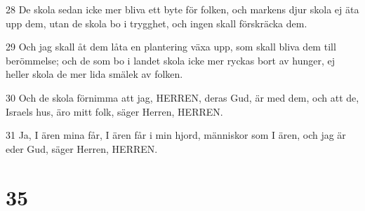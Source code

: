 \par 28 De skola sedan icke mer bliva ett byte för folken, och markens djur skola ej äta upp dem, utan de skola bo i trygghet, och ingen skall förskräcka dem.
\par 29 Och jag skall åt dem låta en plantering växa upp, som skall bliva dem till berömmelse; och de som bo i landet skola icke mer ryckas bort av hunger, ej heller skola de mer lida smälek av folken.
\par 30 Och de skola förnimma att jag, HERREN, deras Gud, är med dem, och att de, Israels hus, äro mitt folk, säger Herren, HERREN.
\par 31 Ja, I ären mina får, I ären får i min hjord, människor som I ären, och jag är eder Gud, säger Herren, HERREN.

\chapter{35}

